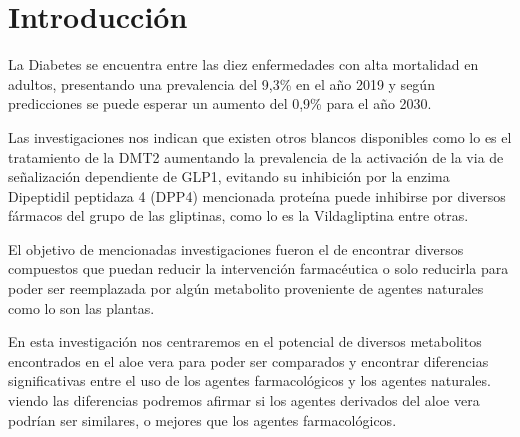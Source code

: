 \chapter{Introducción}
La Diabetes se encuentra entre las diez enfermedades con alta mortalidad en adultos, presentando una prevalencia del 9,3\% en el año 2019 y según predicciones se puede esperar un aumento del 0,9\% para el año 2030. %

Las investigaciones nos indican que existen otros blancos disponibles como lo es el tratamiento de la DMT2 aumentando la prevalencia de la activación de la via de señalización dependiente de GLP1, evitando su inhibición por la enzima Dipeptidil peptidaza 4 (DPP4) mencionada proteína puede inhibirse por diversos fármacos del grupo de las gliptinas, como lo es la Vildagliptina entre otras. %

El objetivo de mencionadas investigaciones fueron el de encontrar diversos compuestos que puedan reducir la intervención farmacéutica o solo reducirla para poder ser reemplazada por algún metabolito proveniente de agentes naturales como lo son las plantas. %

En esta investigación nos centraremos en el potencial de diversos metabolitos encontrados en el aloe vera para poder ser comparados y encontrar diferencias significativas entre el uso de los agentes farmacológicos y los agentes naturales. viendo las diferencias podremos afirmar si los agentes derivados del aloe vera podrían ser similares, o mejores que los agentes farmacológicos. %